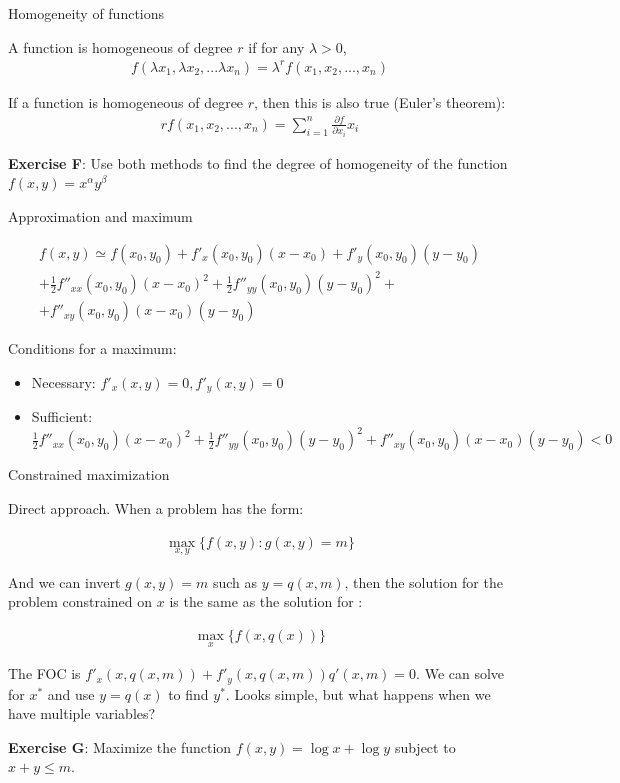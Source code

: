 \documentclass[handout]{beamer}
\begin{document}
\begin{frame}{Homogeneity of functions}

A function is homogeneous of degree $r$ if for any $\lambda>0$, 
\begin{align*}
f(\lambda x_1, \lambda x_2, ... \lambda x_n) = \lambda^r f(x_1,x_2,...,x_n)
\end{align*}

If a function is homogeneous of degree $r$, then this is also true (Euler's theorem):
\begin{align*}
r f(x_1,x_2,...,x_n) = \sum_{i=1}^n \frac{\partial f}{\partial x_i} x_i
\end{align*}

\textbf{Exercise F}: Use both methods to find the degree of homogeneity of the function $f(x,y)=x^\alpha y^\beta$ 
\end{frame}

\begin{frame}{Approximation and maximum}

\begin{eqnarray*}
f(x,y) \simeq f(x_0,y_0) + f'_x(x_0,y_0)(x-x_0) + f'_y(x_0,y_0)(y-y_0)  \\
	+\frac{1}{2}f''_{xx}(x_0,y_0)(x-x_0)^2  + \frac{1}{2}f''_{yy}(x_0,y_0)(y-y_0)^2 + \\
	+f''_{xy}(x_0,y_0)(x-x_0)(y-y_0) 
\end{eqnarray*}

Conditions for a maximum: 
\begin{itemize}
\item Necessary: $f'_x(x,y)=0, f'_y(x,y)=0$
\item Sufficient: $\frac{1}{2}f''_{xx}(x_0,y_0)(x-x_0)^2  + \frac{1}{2}f''_{yy}(x_0,y_0)(y-y_0)^2 +f''_{xy}(x_0,y_0)(x-x_0)(y-y_0)<0$ 
\end{itemize}

\end{frame}

\begin{frame}{Constrained maximization}

Direct approach. When a problem has the form:

\begin{eqnarray}
\max_{x,y} \{ f(x,y): g(x,y)=m\}
\end{eqnarray}

And we can invert $g(x,y)=m$ such as $y=q(x,m)$, then the solution for the problem constrained on $x$ is the same as the solution for :

\begin{eqnarray}
\max_{x} \{ f(x,q(x))\}
\end{eqnarray}

The FOC is $f'_x(x,q(x,m)) + f'_y(x,q(x,m))q'(x,m) = 0$. We can solve for $x^*$ and use $y=q(x)$ to find $y^*$. Looks simple, but what happens when we have multiple variables?

\textbf{Exercise G}: Maximize the function $f(x,y) = \log x + \log y$ subject to $x+y \le m$.
\end{frame}
\end{document}
